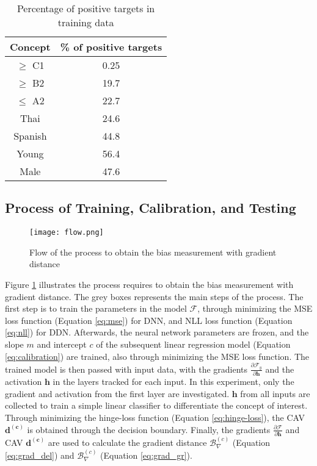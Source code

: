 \begin{table}[H]
    \centering
    \begin{tabular}{|c|c|}
        \hline
        \textbf{Concept} & \textbf{\% of positive targets} \\
        \hline
        $\geq$ C1        & 0.25                            \\
        $\geq$ B2        & 19.7                            \\
        $\leq$ A2        & 22.7                            \\ \hline
        Thai             & 24.6                            \\
        Spanish          & 44.8                            \\ \hline
        Young            & 56.4                            \\ \hline
        Male             & 47.6                            \\
        \hline
    \end{tabular}
    \caption{Percentage of positive targets in training data}
    \label{tab:pos_target}
\end{table}


\subsection{Process of Training, Calibration, and Testing}

\begin{figure}[H]
    \centering
    \texttt{[image: flow.png]}
    \caption{Flow of the process to obtain the bias measurement with gradient distance}
    \label{fig:flow}
\end{figure}

Figure \ref{fig:flow} illustrates the process requires to obtain the bias measurement with gradient distance. The grey boxes represents the main steps of the process. The first step is to train the parameters in the model $\mathcal{F}$, through minimizing the MSE loss function (Equation \ref{eq:mse}) for DNN, and NLL loss function (Equation \ref{eq:nll}) for DDN. Afterwards, the neural network parameters are frozen, and the slope $m$ and intercept $c$ of the subsequent linear regression model (Equation \ref{eq:calibration}) are trained, also through minimizing the MSE loss function. The trained model is then passed with input data, with the gradients $\frac{\partial \mathcal{F}_y}{\partial \boldsymbol{h}}$ and the activation $\boldsymbol{h}$ in the layers tracked for each input. In this experiment, only the gradient and activation from the first layer are investigated. $\boldsymbol{h}$ from all inputs are collected to train a simple linear classifier to differentiate the concept of interest. Through minimizing the hinge-loss function (Equation \ref{eq:hinge-loss}), the CAV $\boldsymbol{d^{(c)}}$ is obtained through the decision boundary. Finally, the gradients $\frac{\partial \mathcal{F}}{\partial \boldsymbol{h}}$ and CAV $\boldsymbol{d^{(c)}}$ are used to calculate the gradient distance $\mathcal{B}^{(c)}_{\nabla}$ (Equation \ref{eq:grad_del}) and $\mathcal{B}^{(c)}_{\nabla}$ (Equation \ref{eq:grad_gr}).

